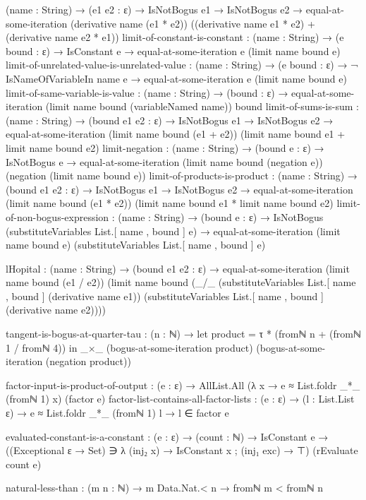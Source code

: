 \documentclass{report}
\begin{document}
\begin{code}
      (name : String) →
      (e1 e2 : ε) →
      IsNotBogus e1 →
      IsNotBogus e2 →
      equal-at-some-iteration (derivative name (e1 * e2))
                              ((derivative name e1 * e2) + (derivative name e2 * e1))
    limit-of-constant-is-constant :
      (name : String) →
      (e bound : ε) →
      IsConstant e →
      equal-at-some-iteration e (limit name bound e)
    limit-of-unrelated-value-is-unrelated-value :
      (name : String) →
      (e bound : ε) →
      ¬ IsNameOfVariableIn name e →
      equal-at-some-iteration e (limit name bound e)
    limit-of-same-variable-is-value :
      (name : String) →
      (bound : ε) →
      equal-at-some-iteration (limit name bound (variableNamed name))
                              bound
    limit-of-sums-is-sum :
      (name : String) →
      (bound e1 e2 : ε) →
      IsNotBogus e1 →
      IsNotBogus e2 →
      equal-at-some-iteration (limit name bound (e1 + e2))
                              (limit name bound e1 + limit name bound e2)
    limit-negation :
      (name : String) →
      (bound e : ε) →
      IsNotBogus e →
      equal-at-some-iteration (limit name bound (negation e))
                              (negation (limit name bound e))
    limit-of-products-is-product :
      (name : String) →
      (bound e1 e2 : ε) →
      IsNotBogus e1 →
      IsNotBogus e2 →
      equal-at-some-iteration (limit name bound (e1 * e2))
                              (limit name bound e1 * limit name bound e2)
    limit-of-non-bogus-expression :
      (name : String) →
      (bound e : ε) →
      IsNotBogus (substituteVariables List.[ name , bound ] e) →
      equal-at-some-iteration (limit name bound e)
                              (substituteVariables List.[ name , bound ] e)

    lHopital :
      (name : String) →
      (bound e1 e2 : ε) →
      equal-at-some-iteration (limit name bound (e1 / e2))
                              (limit name bound (_/_ (substituteVariables List.[ name , bound ]
                                                                          (derivative name e1))
                                                     (substituteVariables List.[ name , bound ]
                                                                          (derivative name e2))))

    tangent-is-bogus-at-quarter-tau :
      (n : ℕ) →
      let product = τ * (fromℕ n + (fromℕ 1 / fromℕ 4)) in
      _×_ (bogus-at-some-iteration product)
          (bogus-at-some-iteration (negation product))

    factor-input-is-product-of-output :
      (e : ε) →
      AllList.All (λ x → e ≈ List.foldr _*_ (fromℕ 1) x) (factor e)
    factor-list-contains-all-factor-lists :
      (e : ε) →
      (l : List.List ε) →
      e ≈ List.foldr _*_ (fromℕ 1) l →
      l ∈ factor e

    evaluated-constant-is-a-constant :
      (e : ε) →
      (count : ℕ) →
      IsConstant e →
      ((Exceptional ε → Set) ∋ λ {(inj₂ x) → IsConstant x ; (inj₁ exc) → ⊤}) (rEvaluate count e)

    natural-less-than : (m n : ℕ) → m Data.Nat.< n → fromℕ m < fromℕ n
\end{code}
\end{document}
